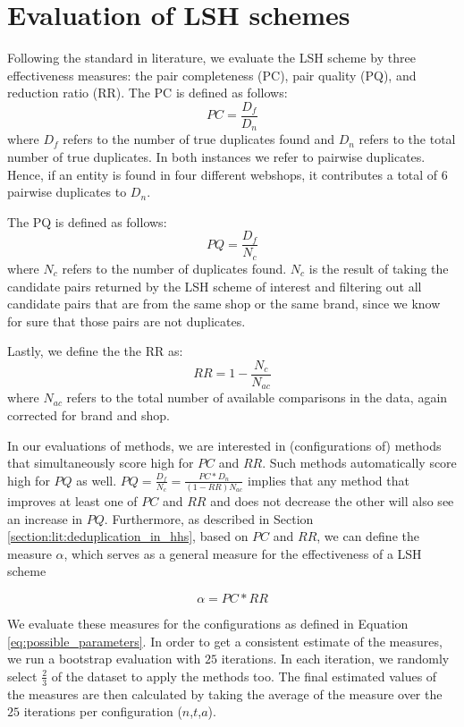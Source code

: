     
\section{Evaluation of LSH schemes}
\label{section:meth:evaluation_lsh_schemes}

Following the standard in literature, we evaluate the LSH scheme by three effectiveness measures: the pair completeness (PC), pair quality (PQ), and reduction ratio (RR). The PC is defined as follows:
\begin{equation}
    PC = \frac{D_f}{D_n}
    \label{eq:formula_pair_completeness}
\end{equation}
where $D_f$ refers to the number of true duplicates found and $D_n$ refers to the total number of true duplicates. In both instances we refer to pairwise duplicates. Hence, if an entity is found in four different webshops, it contributes a total of $6$ pairwise duplicates to $D_n$. 

The PQ is defined as follows:
\begin{equation}
    PQ = \frac{D_f}{N_c}
    \label{eq:formula_pair_quality}
\end{equation}
where $N_c$ refers to the number of duplicates found. $N_c$ is the result of taking the candidate pairs returned by the LSH scheme of interest and filtering out all candidate pairs that are from the same shop or the same brand, since we know for sure that those pairs are not duplicates.

Lastly, we define the the RR as:
\begin{equation}
    RR = 1 - \frac{N_c}{N_{ac}}
    \label{eq:formula_reduction_ratio}
\end{equation}
where $N_{ac}$ refers to the total number of available comparisons in the data, again corrected for brand and shop.

In our evaluations of methods, we are interested in (configurations of) methods that simultaneously score high for $PC$ and $RR$. Such methods automatically score high for $PQ$ as well. $PQ = \frac{D_f}{N_c} = \frac{PC * D_n}{(1-RR)N_{ac}}$ implies that any method that improves at least one of $PC$ and $RR$ and does not decrease the other will also see an increase in $PQ$. Furthermore, as described in Section \ref{section:lit:deduplication_in_hhs}, based on $PC$ and $RR$, we can define the measure $\alpha$, which serves as a general measure for the effectiveness of a LSH scheme

\begin{equation}
    \alpha = PC * RR
\end{equation}

We evaluate these measures for the configurations as defined in Equation \ref{eq:possible_parameters}. In order to get a consistent estimate of the measures, we run a bootstrap evaluation with $25$ iterations. In each iteration, we randomly select $\frac{2}{3}$ of the dataset to apply the methods too. The final estimated values of the measures are then calculated by taking the average of the measure over the $25$ iterations per configuration ($n$,$t$,$a$).

